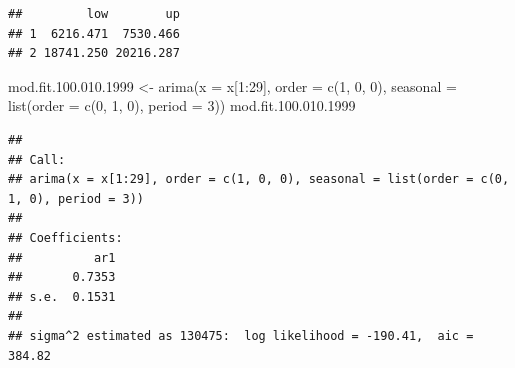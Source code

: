 \documentclass[
]{book}
\newenvironment{Shaded}{\begin{snugshade}}{\end{snugshade}}
\newcommand{\AttributeTok}[1]{\textcolor[rgb]{0.77,0.63,0.00}{#1}}
\newcommand{\ConstantTok}[1]{\textcolor[rgb]{0.00,0.00,0.00}{#1}}
\newcommand{\DecValTok}[1]{\textcolor[rgb]{0.00,0.00,0.81}{#1}}
\newcommand{\FloatTok}[1]{\textcolor[rgb]{0.00,0.00,0.81}{#1}}
\newcommand{\FunctionTok}[1]{\textcolor[rgb]{0.00,0.00,0.00}{#1}}
\newcommand{\NormalTok}[1]{#1}
\newcommand{\OtherTok}[1]{\textcolor[rgb]{0.56,0.35,0.01}{#1}}
\newcommand{\SpecialCharTok}[1]{\textcolor[rgb]{0.00,0.00,0.00}{#1}}
\theoremstyle{definition}
\theoremstyle{definition}
\theoremstyle{definition}
\theoremstyle{definition}
\theoremstyle{remark}
\begin{document}
\begin{Shaded}
\end{Shaded}

\begin{verbatim}
##         low        up
## 1  6216.471  7530.466
## 2 18741.250 20216.287
\end{verbatim}

\begin{Shaded}
\begin{Highlighting}[]
\NormalTok{mod.fit.}\DecValTok{100}\NormalTok{.}\FloatTok{010.1999} \OtherTok{\textless{}{-}} \FunctionTok{arima}\NormalTok{(}\AttributeTok{x =}\NormalTok{ x[}\DecValTok{1}\SpecialCharTok{:}\DecValTok{29}\NormalTok{], }\AttributeTok{order =} \FunctionTok{c}\NormalTok{(}\DecValTok{1}\NormalTok{, }\DecValTok{0}\NormalTok{, }\DecValTok{0}\NormalTok{), }\AttributeTok{seasonal =} \FunctionTok{list}\NormalTok{(}\AttributeTok{order =} \FunctionTok{c}\NormalTok{(}\DecValTok{0}\NormalTok{, }\DecValTok{1}\NormalTok{, }\DecValTok{0}\NormalTok{), }\AttributeTok{period =} \DecValTok{3}\NormalTok{))}
\NormalTok{  mod.fit.}\DecValTok{100}\NormalTok{.}\FloatTok{010.1999}
\end{Highlighting}
\end{Shaded}

\begin{verbatim}
## 
## Call:
## arima(x = x[1:29], order = c(1, 0, 0), seasonal = list(order = c(0, 1, 0), period = 3))
## 
## Coefficients:
##          ar1
##       0.7353
## s.e.  0.1531
## 
## sigma^2 estimated as 130475:  log likelihood = -190.41,  aic = 384.82
\end{verbatim}
\end{document}
